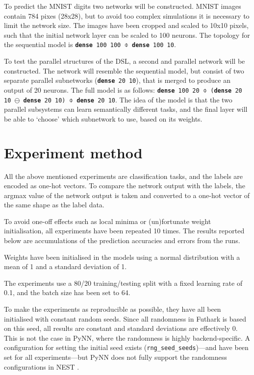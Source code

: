 \documentclass[report.tex]{subfiles}
\begin{document}
To predict the MNIST digits two networks will be constructed.
MNIST images contain 784 pixes (28x28), but to avoid too complex simulations
it is necessary to limit the network size.
The images have been cropped and scaled to 10x10 pixels, such that the initial
network layer can be scaled to 100 neurons.
The topology for the sequential model is 
\texttt{\textbf{dense} 100 100 $\obar$ \textbf{dense} 100 10}.

To test the parallel structures of the \gls{DSL}, a second and parallel network
will be constructed.
The network will resemble the sequential model, but consist of two separate
parallel subnetworks (\texttt{\textbf{dense} 20 10}), that is merged to produce
an output of 20 neurons.
The full model is as follows:
\texttt{\textbf{dense} 100 20 $\obar$ (\textbf{dense} 20 10 $\ominus$\
\textbf{dense} 20 10) $\obar$ \textbf{dense} 20 10}.
The idea of the model is that the two parallel subsystems can learn semantically
different tasks, and the final layer will be able to `choose' which subnetwork to
use, based on its weights.

\section{Experiment method}
All the above mentioned experiments are classification tasks, and the labels
are encoded as one-hot vectors.
To compare the network output with the labels, the argmax value of the network
output is taken and converted to a one-hot vector of the same shape as the label
data.

To avoid one-off effects such as local minima or (un)fortunate weight
initialisation, all experiments have been repeated 10 times.
The results reported below are accumulations of the prediction accuracies
and errors from the runs.

Weights have been initialised in the models using a normal distribution with a
mean of 1 and a standard deviation of 1.

The experiments use a 80/20 training/testing split with a fixed learning rate of
0.1, and the batch size has been set to 64.

To make the experiments as reproducible as possible, they have all been
initialised with constant random seeds.
Since all randomness in Futhark is based on this seed, all results are constant and
standard deviations are effectively 0.
This is not the case in PyNN, where the randomness is highly backend-specific.
A configuration for setting the initial seed exists
(\texttt{rng\_seed\_seeds})---and have been set for all experiments---but
PyNN does not fully support the randomness configurations in NEST
\cite{Gewaltig2007}.
\end{document}
